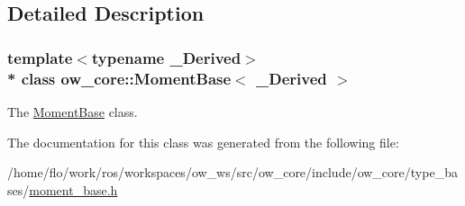 \subsection{Detailed Description}
\subsubsection*{template$<$typename \+\_\+\+Derived$>$\\*
class ow\+\_\+core\+::\+Moment\+Base$<$ \+\_\+\+Derived $>$}

The \hyperlink{classow__core_1_1MomentBase}{Moment\+Base} class. 

The documentation for this class was generated from the following file\+:\begin{DoxyCompactItemize}
\item 
/home/flo/work/ros/workspaces/ow\+\_\+ws/src/ow\+\_\+core/include/ow\+\_\+core/type\+\_\+bases/\hyperlink{moment__base_8h}{moment\+\_\+base.\+h}\end{DoxyCompactItemize}
